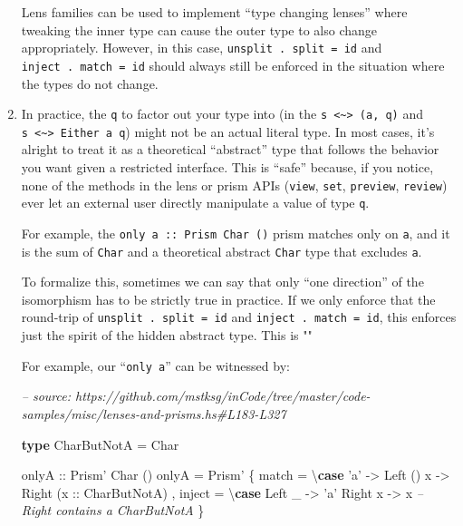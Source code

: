 \documentclass[]{article}
\newenvironment{Shaded}{}{}
\newcommand{\CharTok}[1]{\textcolor[rgb]{0.25,0.44,0.63}{#1}}
\newcommand{\CommentTok}[1]{\textcolor[rgb]{0.38,0.63,0.69}{\textit{#1}}}
\newcommand{\DataTypeTok}[1]{\textcolor[rgb]{0.56,0.13,0.00}{#1}}
\newcommand{\FunctionTok}[1]{\textcolor[rgb]{0.02,0.16,0.49}{#1}}
\newcommand{\KeywordTok}[1]{\textcolor[rgb]{0.00,0.44,0.13}{\textbf{#1}}}
\newcommand{\NormalTok}[1]{#1}
\newcommand{\OtherTok}[1]{\textcolor[rgb]{0.00,0.44,0.13}{#1}}
\begin{document}
\begin{enumerate}
  Lens families can be used to implement ``type changing lenses'' where tweaking
  the inner type can cause the outer type to also change appropriately. However,
  in this case, \texttt{unsplit\ .\ split\ =\ id} and
  \texttt{inject\ .\ match\ =\ id} should always still be enforced in the
  situation where the types do not change.
\item
  In practice, the \texttt{q} to factor out your type into (in the
  \texttt{s\ \textless{}\textasciitilde{}\textgreater{}\ (a,\ q)} and
  \texttt{s\ \textless{}\textasciitilde{}\textgreater{}\ Either\ a\ q}) might
  not be an actual literal type. In most cases, it's alright to treat it as a
  theoretical ``abstract'' type that follows the behavior you want given a
  restricted interface. This is ``safe'' because, if you notice, none of the
  methods in the lens or prism APIs (\texttt{view}, \texttt{set},
  \texttt{preview}, \texttt{review}) ever let an external user directly
  manipulate a value of type \texttt{q}.

  For example, the
  \texttt{only\ \textquotesingle{}a\textquotesingle{}\ ::\ Prism\textquotesingle{}\ Char\ ()}
  prism matches only on \texttt{\textquotesingle{}a\textquotesingle{}}, and it
  is the sum of \texttt{Char} and a theoretical abstract \texttt{Char} type that
  excludes \texttt{\textquotesingle{}a\textquotesingle{}}.

  To formalize this, sometimes we can say that only ``one direction'' of the
  isomorphism has to be strictly true in practice. If we only enforce that the
  round-trip of \texttt{unsplit\ .\ split\ =\ id} and
  \texttt{inject\ .\ match\ =\ id}, this enforces just the spirit of the hidden
  abstract type. This is ""

  For example, our ``\texttt{only\ \textquotesingle{}a\textquotesingle{}}'' can
  be witnessed by:

\begin{Shaded}
\begin{Highlighting}[]
\CommentTok{-- source: https://github.com/mstksg/inCode/tree/master/code-samples/misc/lenses-and-prisms.hs#L183-L327}

\KeywordTok{type} \DataTypeTok{CharButNotA} \FunctionTok{=} \DataTypeTok{Char}

\OtherTok{onlyA ::} \DataTypeTok{Prism'} \DataTypeTok{Char}\NormalTok{ ()}
\NormalTok{onlyA }\FunctionTok{=} \DataTypeTok{Prism'}
\NormalTok{    \{ match  }\FunctionTok{=}\NormalTok{ \textbackslash{}}\KeywordTok{case}
        \CharTok{'a'} \OtherTok{->} \DataTypeTok{Left}\NormalTok{ ()}
\NormalTok{        x   }\OtherTok{->} \DataTypeTok{Right}\NormalTok{ (}\OtherTok{x ::} \DataTypeTok{CharButNotA}\NormalTok{)}
\NormalTok{    , inject }\FunctionTok{=}\NormalTok{ \textbackslash{}}\KeywordTok{case}
        \DataTypeTok{Left}\NormalTok{  _ }\OtherTok{->} \CharTok{'a'}
        \DataTypeTok{Right}\NormalTok{ x }\OtherTok{->}\NormalTok{ x        }\CommentTok{-- Right contains a CharButNotA}
\NormalTok{    \}}
\end{Highlighting}
\end{Shaded}


\end{enumerate}
\end{document}
